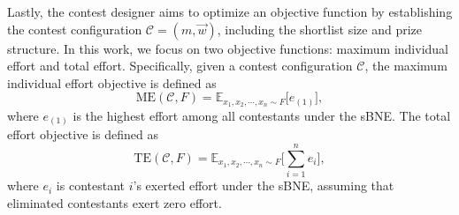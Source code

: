 Lastly, the contest designer aims to optimize an objective function by establishing the contest configuration $\mathcal{C}=(m, \vec{w})$, including the shortlist size and prize structure. In this work, we focus on two objective functions: maximum individual effort and total effort. Specifically, given a contest configuration $\mathcal{C}$, the maximum individual effort objective is defined as
$$
    \text{ME}(\mathcal{C},F)= \mathbb{E}_{x_1, x_2,\cdots, x_n \sim F}\big[e_{(1)}\big],
$$
where $e_{(1)}$ is the highest effort among all contestants under the sBNE. The total effort objective is defined as
$$
    \text{TE}(\mathcal{C},F)= \mathbb{E}_{x_1, x_2,\cdots, x_n \sim F}\big[\sum_{i=1}^n e_{i}\big],
$$
where $e_i$ is contestant $i$'s exerted effort under the sBNE, assuming that eliminated contestants exert zero effort. 


